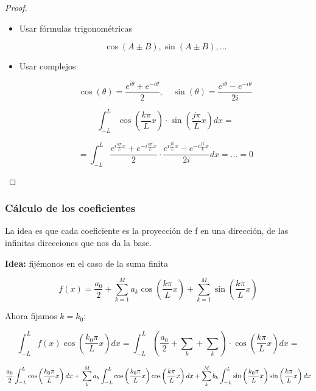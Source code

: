 			\begin{proof}

				\begin{itemize}
					\item Usar fórmulas trigonométricas

						\[\cos(A ± B), \sin(A ± B), …\]

					\item Usar complejos:

						\[ \cos(\theta) = \frac{e^{i\theta} + e^{-i\theta} }{2}, \quad \sin(\theta) = \frac{e^{i\theta} - e^{-i\theta} }{2i}\]

						\[  \int^{L}_{-L} \cos \left( \frac{k \pi}{L} x \right) \cdot \sin \left( \frac{j \pi}{L} x \right) dx = \]

						\[ = \int^L_{-L} \frac{e^{i\frac{k\pi}{L}x} + e^{-i\frac{k\pi}{L}x} }{2} \cdot \frac{e^{i\frac{j\pi}{L}x} - e^{-i\frac{j\pi}{L}x} }{2i} dx = … = 0 \]

				\end{itemize}

			\end{proof}




	\subsubsection{Cálculo de los coeficientes}

		La idea es que cada coeficiente es la proyección de f en una dirección, de las infinitas direcciones que nos da la base.

		\textbf{Idea:} fijémonos en el caso de la suma finita

		\[ f(x) = \frac{a_0}{2}+ \sum_{k=1}^M a_k \cos \left( \frac{k \pi}{L} x \right) + \sum_{k=1}^M \sin \left( \frac{k \pi}{L} x \right)\]

		Ahora fijamos $k=k_0$:

		\[ \int^L_{-L} f(x) \cos \left( \frac{k_0 \pi}{L} x \right) dx = \int^L_{-L} (\frac{a_0}{2} + \sum_k + \sum_k ) \cdot  \cos \left( \frac{k \pi}{L} x \right) dx  = \]

		\[ \frac{a_0}{2}  \int^L_{-L} \cos \left( \frac{k_0 \pi}{L} x \right) dx +\\
		\sum_k^M a_k \int^L_{-L} \cos \left( \frac{k_0 \pi}{L} x \right) \cos \left( \frac{k \pi}{L} x \right) dx +
		\sum_k^M b_k \int^L_{-L} \sin \left( \frac{k_0 \pi}{L} x \right) \sin \left( \frac{k \pi}{L} x \right) dx \]

